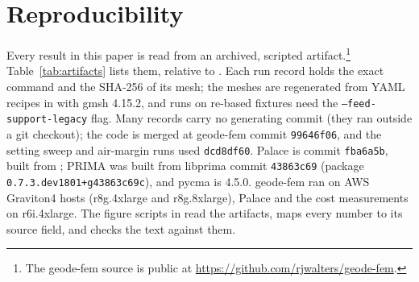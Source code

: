 \documentclass{anvil-paper}
\begin{document}
\section{Reproducibility}
\label{sec:repro}

Every result in this paper is read from an archived, scripted
artifact.\footnote{The geode-fem source is public at
\url{https://github.com/rjwalters/geode-fem}.}
Table~\ref{tab:artifacts} lists them, relative to
. Each run record holds the exact
command and the SHA-256 of its mesh; the meshes are regenerated from YAML
recipes in  with gmsh 4.15.2, and runs on re-based
fixtures need the \texttt{--feed-support-legacy} flag. Many records carry no
generating commit (they ran outside a git checkout); the code is merged at
geode-fem commit \texttt{99646f06}, and the setting sweep and air-margin
runs used \texttt{dcd8df60}. Palace is commit \texttt{fba6a5b}, built from
; PRIMA was built from libprima
commit \texttt{43863c69} (package \texttt{0.7.3.dev1801+g43863c69c}), and
pycma is 4.5.0. geode-fem ran on AWS Graviton4 hosts (r8g.4xlarge and
r8g.8xlarge), Palace and the cost measurements on r6i.4xlarge. The figure
scripts in  read the artifacts,  maps
every number to its source field, and  checks the
text against them.
\end{document}
